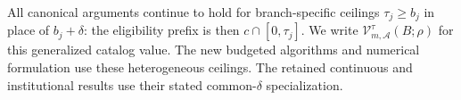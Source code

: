 All canonical arguments continue to hold for branch-specific ceilings $\tau_j\geq b_j$ in place of $b_j+\delta$: the eligibility prefix is then $c\cap[0,\tau_j]$. We write $\mathcal V_{m,\mathcal A}^{\tau}(B;\rho)$ for this generalized catalog value. The new budgeted algorithms and numerical formulation use these heterogeneous ceilings. The retained continuous and institutional results use their stated common-$\delta$ specialization.
